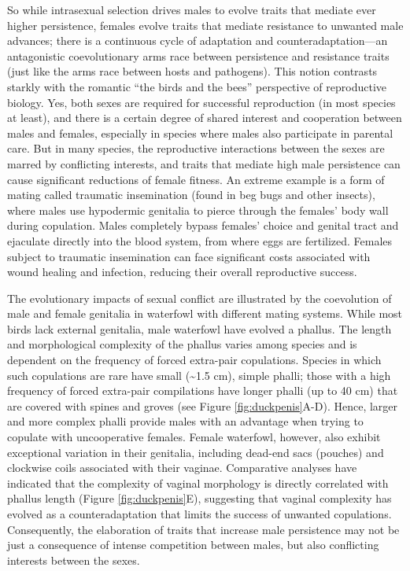 \documentclass[
]{book}
\begin{document}
So while intrasexual selection drives males to evolve traits that mediate ever higher persistence, females evolve traits that mediate resistance to unwanted male advances; there is a continuous cycle of adaptation and counteradaptation---an antagonistic coevolutionary arms race between persistence and resistance traits (just like the arms race between hosts and pathogens). This notion contrasts starkly with the romantic ``the birds and the bees'' perspective of reproductive biology. Yes, both sexes are required for successful reproduction (in most species at least), and there is a certain degree of shared interest and cooperation between males and females, especially in species where males also participate in parental care. But in many species, the reproductive interactions between the sexes are marred by conflicting interests, and traits that mediate high male persistence can cause significant reductions of female fitness. An extreme example is a form of mating called traumatic insemination (found in beg bugs and other insects), where males use hypodermic genitalia to pierce through the females' body wall during copulation. Males completely bypass females' choice and genital tract and ejaculate directly into the blood system, from where eggs are fertilized. Females subject to traumatic insemination can face significant costs associated with wound healing and infection, reducing their overall reproductive success.

The evolutionary impacts of sexual conflict are illustrated by the coevolution of male and female genitalia in waterfowl with different mating systems. While most birds lack external genitalia, male waterfowl have evolved a phallus. The length and morphological complexity of the phallus varies among species and is dependent on the frequency of forced extra-pair copulations. Species in which such copulations are rare have small (\textasciitilde1.5 cm), simple phalli; those with a high frequency of forced extra-pair compilations have longer phalli (up to 40 cm) that are covered with spines and groves (see Figure \ref{fig:duckpenis}A-D). Hence, larger and more complex phalli provide males with an advantage when trying to copulate with uncooperative females. Female waterfowl, however, also exhibit exceptional variation in their genitalia, including dead-end sacs (pouches) and clockwise coils associated with their vaginae. Comparative analyses have indicated that the complexity of vaginal morphology is directly correlated with phallus length (Figure \ref{fig:duckpenis}E), suggesting that vaginal complexity has evolved as a counteradaptation that limits the success of unwanted copulations. Consequently, the elaboration of traits that increase male persistence may not be just a consequence of intense competition between males, but also conflicting interests between the sexes.
\end{document}
